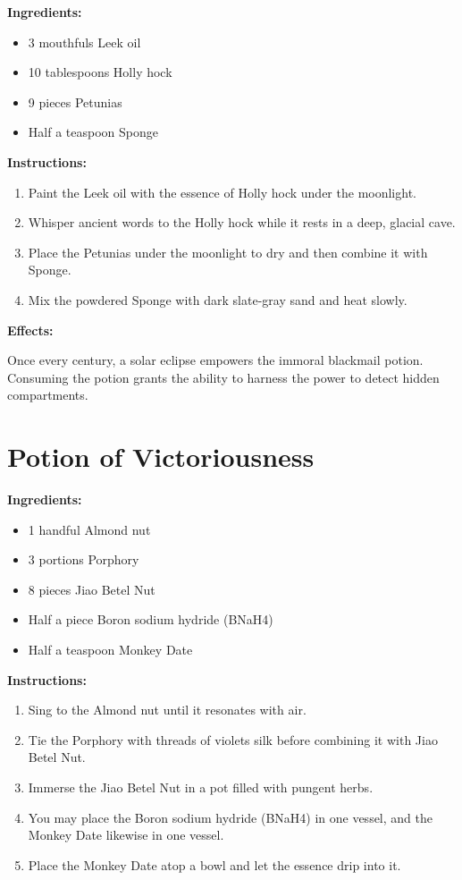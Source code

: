 \documentclass{article}
\begin{document}
\textbf{Ingredients:}

\begin{itemize}
  \item 3 mouthfuls Leek oil
  \item 10 tablespoons Holly hock
  \item 9 pieces Petunias
  \item Half a teaspoon Sponge
\end{itemize}

\textbf{Instructions:}

\begin{enumerate}
  \item Paint the Leek oil with the essence of Holly hock under the moonlight.
  \item Whisper ancient words to the Holly hock while it rests in a deep, glacial cave.
  \item Place the Petunias under the moonlight to dry and then combine it with Sponge.
  \item Mix the powdered Sponge with dark slate-gray sand and heat slowly.
\end{enumerate}

\textbf{Effects:}

Once every century, a solar eclipse empowers the immoral blackmail potion. Consuming the potion grants the ability to harness the power to detect hidden compartments.

\newpage
\section*{Potion of Victoriousness}

\textbf{Ingredients:}

\begin{itemize}
  \item 1 handful Almond nut
  \item 3 portions Porphory
  \item 8 pieces Jiao Betel Nut
  \item Half a piece Boron sodium hydride (BNaH4)
  \item Half a teaspoon Monkey Date
\end{itemize}

\textbf{Instructions:}

\begin{enumerate}
  \item Sing to the Almond nut until it resonates with air.
  \item Tie the Porphory with threads of violets silk before combining it with Jiao Betel Nut.
  \item Immerse the Jiao Betel Nut in a pot filled with pungent herbs.
  \item You may place the Boron sodium hydride (BNaH4) in one vessel, and the Monkey Date likewise in one vessel.
  \item Place the Monkey Date atop a bowl and let the essence drip into it.
\end{enumerate}
\end{document}
